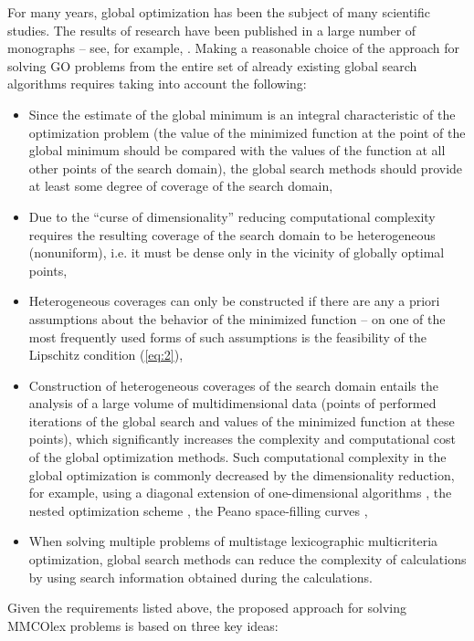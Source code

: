 \documentclass[smallextended]{svjour3}       %
\begin{document}
For many years, global optimization has been the subject of many scientific studies. The results of research have been published in a large number of monographs -- see, for example, \cite{c17,c18,c19,c20,c21,c22,c23,c24,c25}. Making a reasonable choice of the approach for solving GO problems from the entire set of already existing global search algorithms requires taking into account the following:

\begin{itemize}
	\item Since the estimate of the global minimum is an integral characteristic of the optimization problem (the value of the minimized function at the point of the global minimum should be compared with the values of the function at all other points of the search domain), the global search methods should provide at least some degree of coverage of the search domain,
	\item Due to the ``curse of dimensionality'' reducing computational complexity requires the resulting coverage of the search domain to be heterogeneous (nonuniform), i.e. it must be dense only in the vicinity of globally optimal points,
	\item Heterogeneous coverages can only be constructed if there are any a priori assumptions about the behavior of the minimized function -- on one of the most frequently used forms of such assumptions is the feasibility of the Lipschitz condition (\ref{eq:2}),
	\item Construction of heterogeneous coverages of the search domain entails the analysis of a large volume of multidimensional data (points of performed iterations of the global search and values of the minimized function at these points), which significantly increases the complexity and computational cost of the global optimization methods. Such computational complexity in the global optimization is commonly decreased by the dimensionality reduction, for example, using a diagonal extension of one-dimensional algorithms \cite{c22,c45}, the nested optimization scheme \cite{c46,c47}, the Peano space-filling curves \cite{c17,c23},
	\item When solving multiple problems of multistage lexicographic multicriteria optimization, global search methods can reduce the complexity of calculations by using search information obtained during the calculations.
\end{itemize}

Given the requirements listed above, the proposed approach for solving MMCOlex problems is based on three key ideas:
\end{document}
